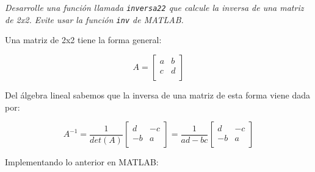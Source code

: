 \textit{Desarrolle una función llamada \texttt{inversa22} que calcule la inversa de una matriz de 2x2. Evite usar 
la función \texttt{inv} de MATLAB.}



Una matriz de 2x2 tiene la forma general:

$$
A=\left[
\begin{array}{cc}
a & b \\
c & d \\
\end{array}
\right]
$$

Del álgebra lineal sabemos que la inversa de una matriz de esta forma viene dada por:

$$
A^{-1}=\frac{1}{det(A)}
\left[
\begin{array}{cc}
d & -c \\
-b & a \\
\end{array}
\right] = 
\frac{1}{ad-bc}
\left[ \begin{array}{cc}
d & -c \\
-b & a \\
\end{array} \right]
$$

Implementando lo anterior en MATLAB:

